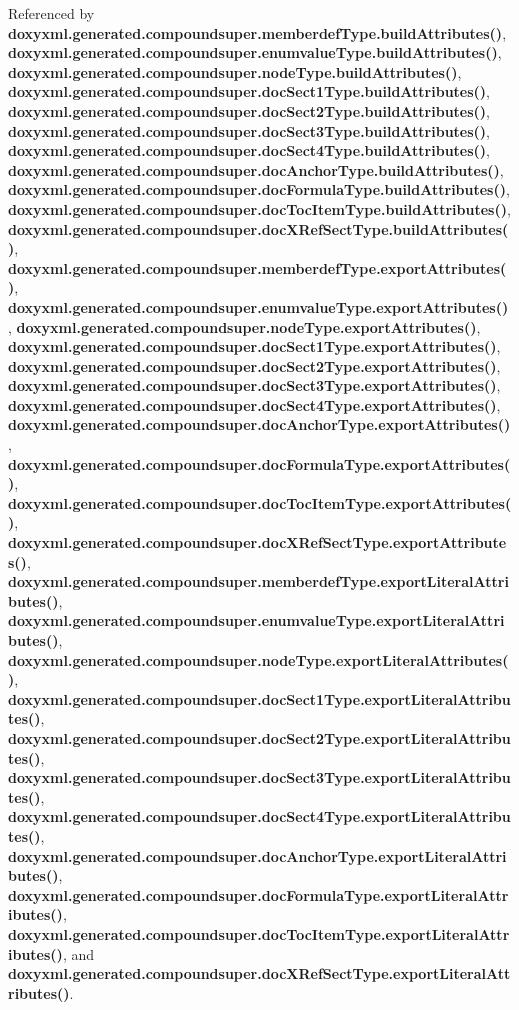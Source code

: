 Referenced by {\bf doxyxml.\+generated.\+compoundsuper.\+memberdef\+Type.\+build\+Attributes()}, {\bf doxyxml.\+generated.\+compoundsuper.\+enumvalue\+Type.\+build\+Attributes()}, {\bf doxyxml.\+generated.\+compoundsuper.\+node\+Type.\+build\+Attributes()}, {\bf doxyxml.\+generated.\+compoundsuper.\+doc\+Sect1\+Type.\+build\+Attributes()}, {\bf doxyxml.\+generated.\+compoundsuper.\+doc\+Sect2\+Type.\+build\+Attributes()}, {\bf doxyxml.\+generated.\+compoundsuper.\+doc\+Sect3\+Type.\+build\+Attributes()}, {\bf doxyxml.\+generated.\+compoundsuper.\+doc\+Sect4\+Type.\+build\+Attributes()}, {\bf doxyxml.\+generated.\+compoundsuper.\+doc\+Anchor\+Type.\+build\+Attributes()}, {\bf doxyxml.\+generated.\+compoundsuper.\+doc\+Formula\+Type.\+build\+Attributes()}, {\bf doxyxml.\+generated.\+compoundsuper.\+doc\+Toc\+Item\+Type.\+build\+Attributes()}, {\bf doxyxml.\+generated.\+compoundsuper.\+doc\+X\+Ref\+Sect\+Type.\+build\+Attributes()}, {\bf doxyxml.\+generated.\+compoundsuper.\+memberdef\+Type.\+export\+Attributes()}, {\bf doxyxml.\+generated.\+compoundsuper.\+enumvalue\+Type.\+export\+Attributes()}, {\bf doxyxml.\+generated.\+compoundsuper.\+node\+Type.\+export\+Attributes()}, {\bf doxyxml.\+generated.\+compoundsuper.\+doc\+Sect1\+Type.\+export\+Attributes()}, {\bf doxyxml.\+generated.\+compoundsuper.\+doc\+Sect2\+Type.\+export\+Attributes()}, {\bf doxyxml.\+generated.\+compoundsuper.\+doc\+Sect3\+Type.\+export\+Attributes()}, {\bf doxyxml.\+generated.\+compoundsuper.\+doc\+Sect4\+Type.\+export\+Attributes()}, {\bf doxyxml.\+generated.\+compoundsuper.\+doc\+Anchor\+Type.\+export\+Attributes()}, {\bf doxyxml.\+generated.\+compoundsuper.\+doc\+Formula\+Type.\+export\+Attributes()}, {\bf doxyxml.\+generated.\+compoundsuper.\+doc\+Toc\+Item\+Type.\+export\+Attributes()}, {\bf doxyxml.\+generated.\+compoundsuper.\+doc\+X\+Ref\+Sect\+Type.\+export\+Attributes()}, {\bf doxyxml.\+generated.\+compoundsuper.\+memberdef\+Type.\+export\+Literal\+Attributes()}, {\bf doxyxml.\+generated.\+compoundsuper.\+enumvalue\+Type.\+export\+Literal\+Attributes()}, {\bf doxyxml.\+generated.\+compoundsuper.\+node\+Type.\+export\+Literal\+Attributes()}, {\bf doxyxml.\+generated.\+compoundsuper.\+doc\+Sect1\+Type.\+export\+Literal\+Attributes()}, {\bf doxyxml.\+generated.\+compoundsuper.\+doc\+Sect2\+Type.\+export\+Literal\+Attributes()}, {\bf doxyxml.\+generated.\+compoundsuper.\+doc\+Sect3\+Type.\+export\+Literal\+Attributes()}, {\bf doxyxml.\+generated.\+compoundsuper.\+doc\+Sect4\+Type.\+export\+Literal\+Attributes()}, {\bf doxyxml.\+generated.\+compoundsuper.\+doc\+Anchor\+Type.\+export\+Literal\+Attributes()}, {\bf doxyxml.\+generated.\+compoundsuper.\+doc\+Formula\+Type.\+export\+Literal\+Attributes()}, {\bf doxyxml.\+generated.\+compoundsuper.\+doc\+Toc\+Item\+Type.\+export\+Literal\+Attributes()}, and {\bf doxyxml.\+generated.\+compoundsuper.\+doc\+X\+Ref\+Sect\+Type.\+export\+Literal\+Attributes()}.

